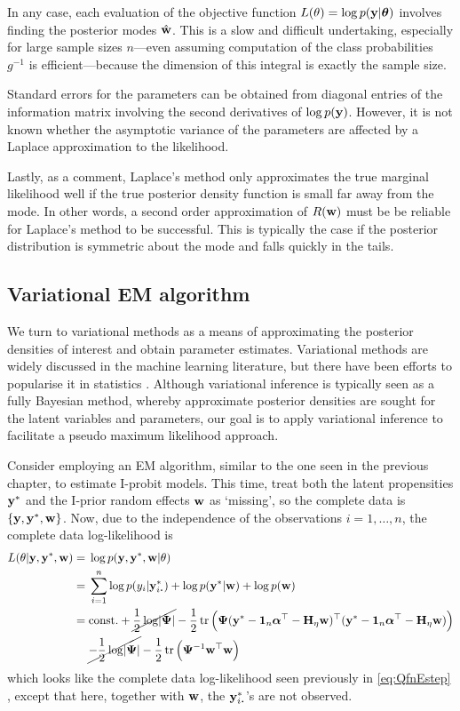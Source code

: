 In any case, each evaluation of the objective function $L(\theta) = \log p({\mathbf y}|{\bm\theta})$ involves finding the posterior modes $\hat{{\mathbf w}}$.
This is a slow and difficult undertaking, especially for large sample sizes $n$---even assuming computation of the class probabilities $g^{-1}$ is efficient---because the dimension of this integral is exactly the sample size.

Standard errors for the parameters can be obtained from diagonal entries of the information matrix involving the second derivatives of $\log p({\mathbf y})$.
However, it is not known whether the asymptotic variance of the parameters are affected by a Laplace approximation to the likelihood.

Lastly, as a comment, Laplace's method only approximates the true marginal likelihood well if the true posterior density function is small far away from the mode.
In other words, a second order approximation of $R({\mathbf w})$ must be be reliable for Laplace's method to be successful.
This is typically the case if the posterior distribution is symmetric about the mode and falls quickly in the tails.

\subsection{Variational EM algorithm}

We turn to variational methods as a means of approximating the posterior densities of interest and obtain parameter estimates.
Variational methods are widely discussed in the machine learning literature, but there have been efforts to popularise it in statistics \citep{blei2017variational}.
Although variational inference is typically seen as a fully Bayesian method, whereby approximate posterior densities are sought for the latent variables and parameters, our goal is to apply variational inference to facilitate a pseudo maximum likelihood approach.

Consider employing an EM algorithm, similar to the one seen in the previous chapter, to estimate I-probit models.
This time, treat both the latent propensities ${\mathbf y}^*$ and the I-prior random effects ${\mathbf w}$ as `missing', so the complete data is $\{{\mathbf y},{\mathbf y}^*,{\mathbf w}\}$.
Now, due to the independence of the observations $i=1,\dots,n$, the complete data log-likelihood is
\begin{align}
  L(\theta |\by,\by^*,\bw) 
  ={}& \log p(\by,\by^*,\bw|\theta) \nonumber \\
  ={}& \sum_{i=1}^n \log p(y_i|\by^*_{i \bigcdot}) 
  + \log p(\by^*|\bw) + \log p(\bw) \nonumber \\
  ={}& \const + \cancel{\half\log\abs{\bPsi}} - \half \tr  
  \Big(
    \bPsi(\by^* - \bone_n\balpha^\top - \bH_\eta\bw)^\top 
    (\by^* - \bone_n\balpha^\top - \bH_\eta\bw)
  \Big) \nonumber \\
  &\cancel{- \half\log\abs{\bPsi}} 
  - \half \tr \Big(\bPsi^{-1} \bw^\top  \bw \Big)
  \label{eq:logjointprobit}
\end{align}
which looks like the complete data log-likelihood seen previously in \cref{eq:QfnEstep} , except that here, together with ${\mathbf w}$, the $\by^*_{i \bigcdot}$'s are not observed.

